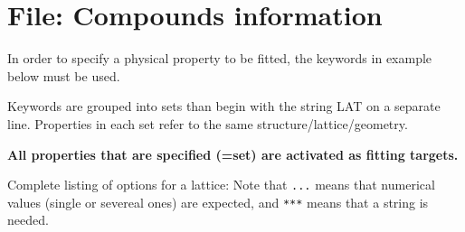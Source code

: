 \documentclass[a4paper,12pt,pdftex,onecolumn]{article}
\begin{document}
\section{File: Compounds information}

In order to specify a physical property to be fitted,
the keywords in example below must be used.

Keywords are grouped into sets than begin with the string
LAT on a separate line. Properties in each set refer to
the same structure/lattice/geometry.

\textbf{All properties that are specified (=set) are activated as fitting
targets.}


Complete listing of options for a lattice: Note that \verb+...+ means that
numerical values (single or severeal ones) are expected, and \verb+***+ means
that a string is needed.
\end{document}
